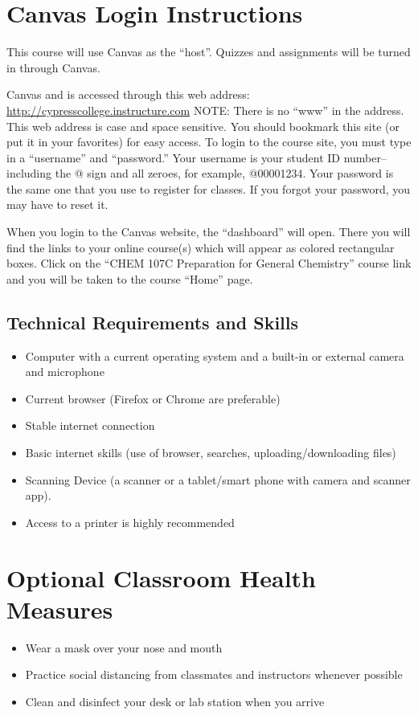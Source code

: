 \documentclass[11pt]{article}
\begin{document}
\section{Canvas Login Instructions}

This course will use Canvas as the “host”. Quizzes and assignments will be turned in
through Canvas. 

Canvas and is accessed through this web address: \url{http://cypresscollege.instructure.com}
NOTE: There is no “www” in the address. This web address is case and space sensitive. You should
bookmark this site (or put it in your favorites) for easy access. To login to the course site,
you must type in a “username” and “password.” Your username is your student ID number--including
the @ sign and all zeroes, for example, @00001234. Your password is the same one that you use
to register for classes. If you forgot your password, you may have to reset it.  

When you login to the Canvas website, the “dashboard” will open. There you will find the links
to your online course(s) which will appear as colored rectangular boxes. Click on the “CHEM 107C
Preparation for General Chemistry” course link and you will be taken to the course “Home” page. 

\subsection{Technical Requirements and Skills}
\begin{itemize}
\item Computer with a current operating system and a built-in or external camera and
  microphone
\item Current browser (Firefox or Chrome are preferable)
\item Stable internet connection
\item Basic internet skills (use of browser, searches, uploading/downloading files)
\item Scanning Device (a scanner or a tablet/smart phone with camera and scanner app).
\item Access to a printer is highly recommended
\end{itemize}

\section{Optional Classroom Health Measures}
\begin{itemize}
\item Wear a mask over your nose and mouth 
\item Practice social distancing from classmates and instructors whenever possible
\item Clean and disinfect your desk or lab station when you arrive
\end{itemize}
\end{document}
